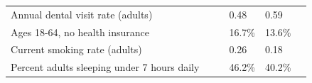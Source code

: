\documentclass[9pt]{report}
\begin{document}
\begin{tabular}{p{.10in}p{.10in}p{.10in}p{3.7in}>{\hfill}p{.85in}>{\hfill}p{.85in}>{\hfill}p{.85in}>{\hfill}p{.85in}p{0.1in}}
\multicolumn{4}{l}{\parbox{3.6in}{\strut\raggedright{{Annual dental visit rate (adults)}}\strut}} &  &  & 0.48 & 0.59 & \multicolumn{1}{l}{}  \\ 
\multicolumn{4}{l}{\parbox{3.6in}{\strut\raggedright{{Ages 18-64, no health insurance}}\strut}} &  &  & 16.7\% & 13.6\% & \multicolumn{1}{l}{}  \\ 
\multicolumn{4}{l}{\parbox{3.6in}{\strut\raggedright{{Current smoking rate (adults)}}\strut}} &  &  & 0.26 & 0.18 & \multicolumn{1}{l}{}  \\ 
\multicolumn{4}{l}{\parbox{3.6in}{\strut\raggedright{{Percent adults sleeping under 7 hours daily}}\strut}} &  &  & 46.2\% & 40.2\% & \multicolumn{1}{l}{}  \\ 

\end{tabular}
\setlength{\tabcolsep}{6pt} %


\vspace{36pt}
\linespread{1.5}
\theendnotes
\end{document}
